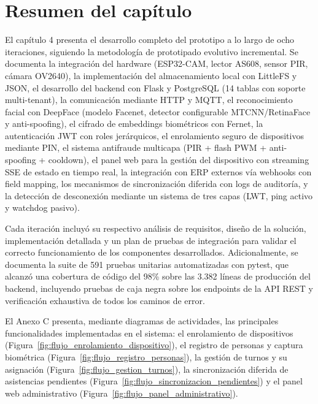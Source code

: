 \section{Resumen del capítulo}
El capítulo 4 presenta el desarrollo completo del prototipo a lo largo de ocho iteraciones, siguiendo la metodología de prototipado evolutivo incremental. Se documenta la integración del hardware (ESP32-CAM, lector AS608, sensor PIR, cámara OV2640), la implementación del almacenamiento local con LittleFS y JSON, el desarrollo del backend con Flask y PostgreSQL (14 tablas con soporte multi-tenant), la comunicación mediante HTTP y MQTT, el reconocimiento facial con DeepFace (modelo Facenet, detector configurable MTCNN/RetinaFace y anti-spoofing), el cifrado de embeddings biométricos con Fernet, la autenticación JWT con roles jerárquicos, el enrolamiento seguro de dispositivos mediante PIN, el sistema antifraude multicapa (PIR + flash PWM + anti-spoofing + cooldown), el panel web para la gestión del dispositivo con streaming SSE de estado en tiempo real, la integración con ERP externos vía webhooks con field mapping, los mecanismos de sincronización diferida con logs de auditoría, y la detección de desconexión mediante un sistema de tres capas (LWT, ping activo y watchdog pasivo).

Cada iteración incluyó su respectivo análisis de requisitos, diseño de la solución, implementación detallada y un plan de pruebas de integración para validar el correcto funcionamiento de los componentes desarrollados. Adicionalmente, se documenta la suite de 591 pruebas unitarias automatizadas con pytest, que alcanzó una cobertura de código del 98\% sobre las 3.382 líneas de producción del backend, incluyendo pruebas de caja negra sobre los endpoints de la API REST y verificación exhaustiva de todos los caminos de error.

El Anexo C presenta, mediante diagramas de actividades, las principales funcionalidades implementadas en el sistema: el enrolamiento de dispositivos (Figura~\ref{fig:flujo_enrolamiento_dispositivo}), el registro de personas y captura biométrica (Figura~\ref{fig:flujo_registro_personas}), la gestión de turnos y su asignación (Figura~\ref{fig:flujo_gestion_turnos}), la sincronización diferida de asistencias pendientes (Figura~\ref{fig:flujo_sincronizacion_pendientes}) y el panel web administrativo (Figura~\ref{fig:flujo_panel_administrativo}).